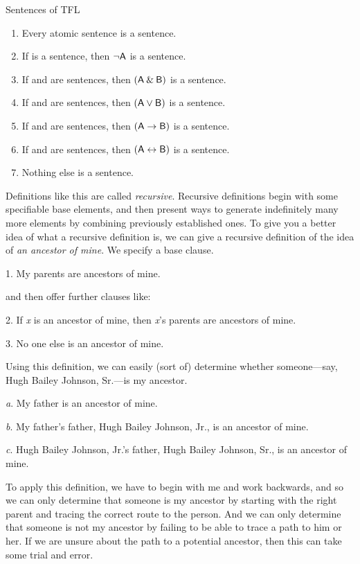 \begin{factboxy2}{Sentences of TFL}\label{TFLsentences}
	\begin{enumerate}
		\item Every atomic sentence is a sentence.
		\item If  is a sentence, then ${\neg}\mathsf{A}$ is a sentence.
		\item If  and  are sentences, then $(\mathsf{A}\mathbin{\&}\mathsf{B})$ is a sentence.
		\item If  and  are sentences, then $(\mathsf{A}\vee\mathsf{B})$ is a sentence.
		\item If  and  are sentences, then $(\mathsf{A}\rightarrow\mathsf{B})$ is a sentence.
		\item If  and  are sentences, then $(\mathsf{A}\leftrightarrow\mathsf{B})$ is a sentence.
		\item Nothing else is a sentence.
	\end{enumerate}
\end{factboxy2}

Definitions like this are called \emph{recursive}. Recursive definitions begin with some specifiable base elements, and then present ways to generate indefinitely many more elements by combining previously established ones. To give you a better idea of what a recursive definition is, we can give a recursive definition of the idea of \emph{an ancestor of mine}. We specify a base clause.
	\begin{ebullet}
		\item[1.] My parents are ancestors of mine.
	\end{ebullet}
and then offer further clauses like:
	\begin{ebullet}
		\item[2.] If \textit{x} is an ancestor of mine, then \textit{x}'s parents are ancestors of mine.
		\item[3.] No one else is an ancestor of mine.
	\end{ebullet}
Using this definition, we can easily (sort of) determine whether someone---say, Hugh Bailey Johnson, Sr.---is my ancestor. 
	\begin{ebullet}
		\item[\textit{a}.] My father is an ancestor of mine. 
		\item[\textit{b}.] My father's father, Hugh Bailey Johnson, Jr., is an ancestor of mine. 
		\item[\textit{c}.] Hugh Bailey Johnson, Jr.'s father, Hugh Bailey Johnson, Sr., is an ancestor of mine. 
	\end{ebullet}
To apply this definition, we have to begin with me and work backwards, and so we can only determine that someone is my ancestor by starting with the right parent and tracing the correct route to the person. And we can only determine that someone is not my ancestor by failing to be able to trace a path to him or her. If we are unsure about the path to a potential ancestor, then this can take some trial and error. 

